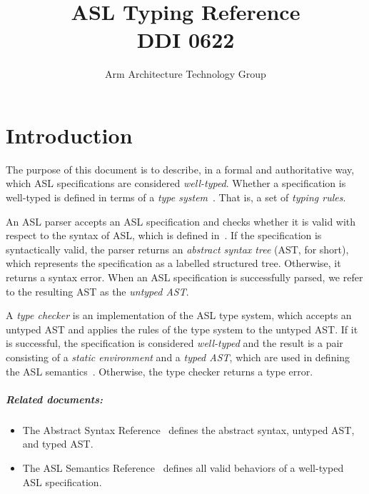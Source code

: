 \documentclass{book}
\author{Arm Architecture Technology Group}
\title{ASL Typing Reference \\
       DDI 0622}
\begin{document}
\maketitle

\tableofcontents{}





\chapter{Introduction}

The purpose of this document is to describe, in a formal and authoritative way,
which ASL specifications are considered \emph{well-typed}.
Whether a specification is well-typed is defined in terms of a \emph{type system}~\cite{TypeSystemsLucaCardelli}.
That is, a set of \emph{typing rules}.

An ASL parser accepts an ASL specification and checks whether it is valid with respect to the syntax of ASL,
which is defined in~\cite{ASLAbstractSyntaxReference}.
If the specification is syntactically valid, the parser returns an \emph{abstract syntax tree} (AST, for short),
which represents the specification as a labelled structured tree. Otherwise, it returns a syntax error.
When an ASL specification is successfully parsed, we refer to the resulting AST as the \emph{untyped AST}.

A \emph{type checker} is an implementation of the ASL type system, which accepts an untyped AST and applies the
rules of the type system to the untyped AST. If it is successful, the specification
is considered \emph{well-typed} and the result is a pair consisting of
a \emph{static environment} and a \emph{typed AST}, which are used in defining the ASL semantics~\cite{ASLSemanticsReference}.
Otherwise, the type checker returns a type error.

\paragraph{Related documents:}
\begin{itemize}
  \item The Abstract Syntax Reference~\cite{ASLAbstractSyntaxReference} defines the abstract syntax, untyped AST, and typed AST.
  \item The ASL Semantics Reference~\cite{ASLSemanticsReference} defines all valid behaviors of a well-typed ASL specification.
\end{itemize}
\end{document}
